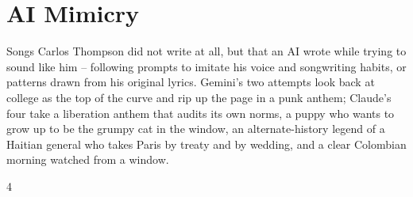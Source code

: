 \documentclass[a4paper,landscape]{memoir}
\begin{document}
\chapter{AI Mimicry}
Songs Carlos Thompson did not write at all, but that an AI wrote while trying to sound like him -- following prompts to imitate his voice and songwriting habits, or patterns drawn from his original lyrics. Gemini's two attempts look back at college as the top of the curve and rip up the page in a punk anthem; Claude's four take a liberation anthem that audits its own norms, a puppy who wants to grow up to be the grumpy cat in the window, an alternate-history legend of a Haitian general who takes Paris by treaty and by wedding, and a clear Colombian morning watched from a window.
\clearpage\begin{multicols*}{4}











\end{multicols*}

\appendix

\backmatter
\printindex[songs]
\clearpage
\printindex[tags]
\end{document}
